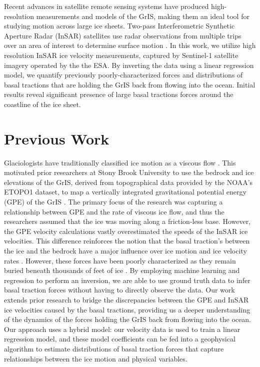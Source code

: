 \documentclass{article}
\begin{document}
Recent advances in satellite remote sensing systems have produced high-resolution measurements and models of the GrIS, making them an ideal tool for studying motion across large ice sheets. Two-pass Interferometric Synthetic Aperture Radar (InSAR) satellites use radar observations from multiple trips over an area of interest to determine surface motion \cite{wild_differential_2019}. In this work, we utilize high resolution InSAR ice velocity measurements, captured by Sentinel-1 satellite imagery operated by the the ESA. By inverting the data using a linear regression model, we quantify previously poorly-characterized forces and distributions of basal tractions that are holding the GrIS back from flowing into the ocean. Initial results reveal significant presence of large basal tractions forces around the coastline of the ice sheet.

\section{Previous Work}

Glaciologists have traditionally classified ice motion as a viscous flow \cite{morland_steady_1980}. This motivated prior researchers at Stony Brook University to use the bedrock and ice elevations of the GrIS, derived from topographical data provided by the NOAA's ETOPO1 dataset, to map a vertically integrated gravitational potential energy (GPE) of the GrIS \cite{information_ncei_etopo1_nodate}. The primary focus of the research was capturing a relationship between GPE and the rate of viscous ice flow, and thus the researchers assumed that the ice was moving along a friction-less base. However, the GPE velocity calculations vastly overestimated the speeds of the InSAR ice velocities. This difference reinforces the notion that the basal traction's between the ice and the bedrock have a major influence over ice motion and ice velocity rates \cite{maier_basal_2021}. However, these forces have been poorly characterized as they remain buried beneath thousands of feet of ice \cite{maier_basal_2021}. By employing machine learning and regression to perform an inversion, we are able to use ground truth data to infer basal traction forces without having to directly observe the data. Our work extends prior research to bridge the discrepancies between the GPE and InSAR ice velocities caused by the basal tractions, providing us a deeper understanding of the dynamics of the forces holding the GrIS back from flowing into the ocean. Our approach uses a hybrid model: our velocity data is used to train a linear regression model, and these model coefficients can be fed into a geophysical algorithm to estimate distributions of basal traction forces that capture relationships between the ice motion and physical variables.
\end{document}
